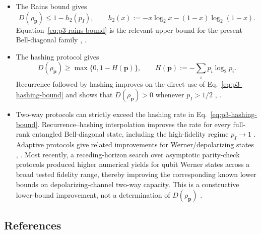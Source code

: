 \begin{itemize}
  \item The Rains bound gives
  \begin{equation}
    D(\rho_{\mathbf p})\le 1-h_2(p_I),
    \qquad h_2(x):=-x\log_2x-(1-x)\log_2(1-x).
    \label{eq:p3-rains-bound}
  \end{equation}
  Equation~\eqref{eq:p3-rains-bound} is the relevant upper bound for the
  present Bell-diagonal family ,
  .

  \item The hashing protocol gives
  \begin{equation}
    D(\rho_{\mathbf p})\ge\max\{0,1-H(\mathbf p)\},
    \qquad H(\mathbf p):=-\sum_i p_i\log_2p_i.
    \label{eq:p3-hashing-bound}
  \end{equation}
  Recurrence followed by hashing improves on the direct use of
  Eq.~\eqref{eq:p3-hashing-bound} and shows that
  $D(\rho_{\mathbf p})>0$ whenever $p_I>1/2$
  ,
  .

  \item Two-way protocols can strictly exceed the hashing rate in
  Eq.~\eqref{eq:p3-hashing-bound}.  Recurrence--hashing interpolation improves
  the rate for every full-rank entangled Bell-diagonal state, including the
  high-fidelity regime $p_I\to1$ .  Adaptive
  protocols give related improvements for Werner/depolarizing states
  , .
  Most recently, a receding-horizon search over asymptotic parity-check
  protocols produced higher numerical yields for qubit Werner states across a
  broad tested fidelity range, thereby improving the corresponding known lower
  bounds on depolarizing-channel two-way capacity.  This is a constructive
  lower-bound improvement, not a determination of $D(\rho_{\mathbf p})$
  .
\end{itemize}

\subsection*{References}

